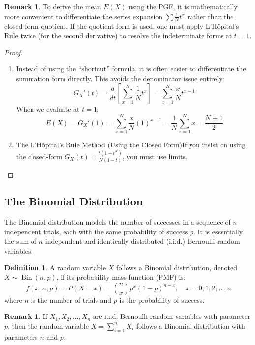 \documentclass[12pt,a4paper]{report}
\theoremstyle{definition}
\newtheorem{definition}[thm]{Definition}
\newtheorem{remark}[thm]{Remark}
\theoremstyle{plain}
\theoremstyle{definition}
\begin{document}
\begin{remark}
To derive the mean $E(X)$ using the PGF, it is mathematically more convenient to differentiate the series expansion $\sum \frac{1}{N}t^x$ rather than the closed-form quotient. If the quotient form is used, one must apply L'Hôpital's Rule twice (for the second derivative) to resolve the indeterminate forms at $t=1$.
\end{remark}

\begin{proof}
\begin{enumerate}
\item Instead of using the ``shortcut'' formula, it is often easier to differentiate the summation form directly. This avoids the denominator issue entirely:\[ G_X'(t) = \frac{d}{dt} \left[ \sum_{x=1}^N \frac{1}{N}t^x \right] = \sum_{x=1}^N \frac{x}{N}t^{x-1} \]When we evaluate at $t=1$:\[ E(X) = G_X'(1) = \sum_{x=1}^N \frac{x}{N}(1)^{x-1} = \frac{1}{N} \sum_{x=1}^N x = \frac{N+1}{2} \]
\item The L'Hôpital's Rule Method (Using the Closed Form)If you insist on using the closed-form $G_X(t) = \frac{t(1-t^N)}{N(1-t)}$, you must use limits. 
\end{enumerate}
\end{proof}








\subsection{The Binomial Distribution}
The Binomial distribution models the number of successes in a sequence of $n$ independent trials, each with the same probability of success $p$. It is essentially the sum of $n$ independent and identically distributed (i.i.d.) Bernoulli random variables.

\begin{definition}
A random variable $X$ follows a Binomial distribution, denoted $X \sim \operatorname{Bin}(n, p)$, if its probability mass function (PMF) is:\[ f(x; n, p) = P(X=x) = \binom{n}{x} p^x (1-p)^{n-x}, \quad x = 0, 1, 2, \dots, n \]where $n$ is the number of trials and $p$ is the probability of success.
\end{definition}



\begin{remark}
If $X_1, X_2, \dots, X_n$ are i.i.d. Bernoulli random variables with parameter $p$, then the random variable $X = \sum_{i=1}^n X_i$ follows a Binomial distribution with parameters $n$ and $p$.
\end{remark}
\end{document}
